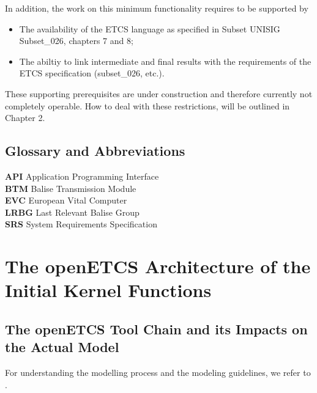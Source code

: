 \documentclass{template/openetcs_report}
\begin{document}
In addition, the work on this minimum functionality requires to be supported by
\begin{itemize}
	\item The availability of the ETCS language as specified in Subset UNISIG Subset\_026, chapters 7 and 8;
	\item The abiltiy to link intermediate and final results with the requirements of the ETCS specification (subset\_026, etc.). 
\end{itemize}
These supporting prerequisites are under construction and therefore currently not completely operable. How to deal with these restrictions, will be outlined in Chapter 2.

\section{Glossary and Abbreviations}

\textbf{API} Application Programming Interface\\
\textbf{BTM} Balise Transmission Module\\
\textbf{EVC} European Vital Computer\\
\textbf{LRBG} Last Relevant Balise Group\\
\textbf{SRS} System Requirements Specification\\


\chapter{The openETCS Architecture of the Initial Kernel Functions}

\section{The openETCS Tool Chain and its Impacts on the Actual Model}

For understanding the modelling process and the modeling guidelines, we refer to \cite{wp3-dow}. 
\end{document}
